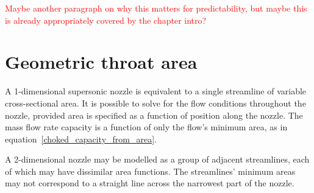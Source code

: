 \documentclass[a4paper, 11pt, twoside]{report}
\begin{document}
\textcolor{red}{Maybe another paragraph on why this matters for predictability, but maybe this is already appropriately covered by the chapter intro?}



\chapter{Geometric throat area}
\label{chapter_geometric_throat_area}





A 1-dimensional supersonic nozzle is equivalent to a single streamline of variable cross-sectional area. It is possible to solve for the flow conditions throughout the nozzle, provided area is specified as a function of position along the nozzle. The mass flow rate capacity is a function of only the flow's minimum area, as in equation~\ref{choked_capacity_from_area}.

A 2-dimensional nozzle may be modelled as a group of adjacent streamlines, each of which may have dissimilar area functions. The streamlines' minimum areas may not correspond to a straight line across the narrowest part of the nozzle. 
\end{document}
